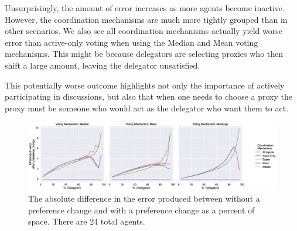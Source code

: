 Unsurprisingly, the amount of error increases as more agents become inactive.
However, the coordination mechanisms are much more tightly grouped than in other
scenarios.
We also see all coordination mechanisms actually yield worse error than active-only
voting when using the Median and Mean voting mechanisms.
This might be because delegators are selecting proxies who then shift a large amount,
leaving the delegator unsatisfied.

This potentially worse outcome highlights not only the importance of actively
participating in discussions, but also that when one needs to choose a proxy the
proxy must be someone who would act as the delegator who want them to act.

\begin{landscape}
    \begin{figure}[p]
        \centering
        \includegraphics[scale=0.55]
        {content/chapter2/figures/abs_diff_from_preference_change_error_as_percent_of_space_abs_mean}
        \caption{
            The absolute difference in the error produced between without a
            preference change and with a preference change as a percent of space.
            There are 24 total agents.
        }
        \label{fig:abs-diff-from-preference-change-error-as-percent-of-space-abs-mean}
    \end{figure}
\end{landscape}
